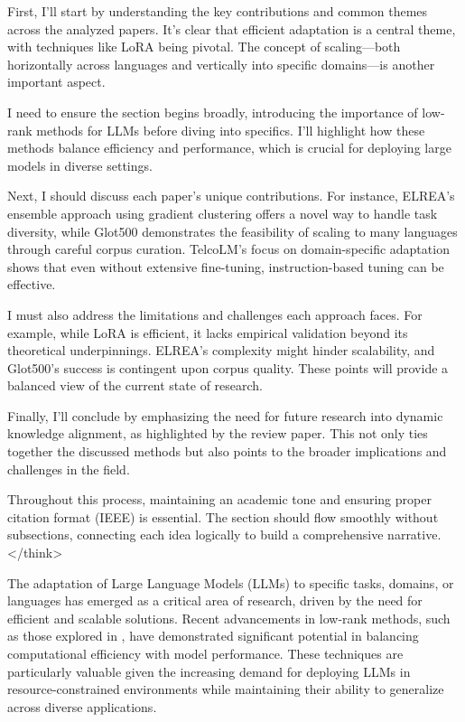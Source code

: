 \documentclass[conference]{IEEEtran}
\begin{document}
First, I'll start by understanding the key contributions and common themes across the analyzed papers. It's clear that efficient adaptation is a central theme, with techniques like LoRA being pivotal. The concept of scaling—both horizontally across languages and vertically into specific domains—is another important aspect.

I need to ensure the section begins broadly, introducing the importance of low-rank methods for LLMs before diving into specifics. I'll highlight how these methods balance efficiency and performance, which is crucial for deploying large models in diverse settings.

Next, I should discuss each paper's unique contributions. For instance, ELREA's ensemble approach using gradient clustering offers a novel way to handle task diversity, while Glot500 demonstrates the feasibility of scaling to many languages through careful corpus curation. TelcoLM's focus on domain-specific adaptation shows that even without extensive fine-tuning, instruction-based tuning can be effective.

I must also address the limitations and challenges each approach faces. For example, while LoRA is efficient, it lacks empirical validation beyond its theoretical underpinnings. ELREA's complexity might hinder scalability, and Glot500's success is contingent upon corpus quality. These points will provide a balanced view of the current state of research.

Finally, I'll conclude by emphasizing the need for future research into dynamic knowledge alignment, as highlighted by the review paper. This not only ties together the discussed methods but also points to the broader implications and challenges in the field.

Throughout this process, maintaining an academic tone and ensuring proper citation format (IEEE) is essential. The section should flow smoothly without subsections, connecting each idea logically to build a comprehensive narrative.
</think>

The adaptation of Large Language Models (LLMs) to specific tasks, domains, or languages has emerged as a critical area of research, driven by the need for efficient and scalable solutions. Recent advancements in low-rank methods, such as those explored in \cite{bX}, have demonstrated significant potential in balancing computational efficiency with model performance. These techniques are particularly valuable given the increasing demand for deploying LLMs in resource-constrained environments while maintaining their ability to generalize across diverse applications.
\end{document}
